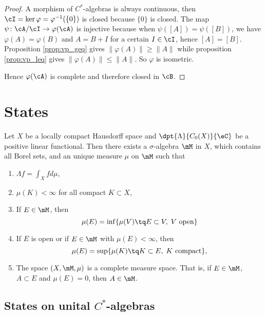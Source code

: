 \begin{proof}
    A morphism of $C^*$-algebras is always continuous,%
    then $\cI=\ker\varphi=\varphi^{-1}(\{ 0 \})$ is closed because $\{ 0 \}$ is closed. The map $\psi\colon \cA/\cI\to \varphi(\cA)$ is injective because when $\psi([A])=\psi([B])$, we have $\varphi(A)=\varphi(B)$ and $A=B+I$ for a certain $I\in\cI$, hence $[A]=[B]$. Proposition \ref{prop:vp_geq} gives $\| \varphi(A) \|\geq\| A \|$ while proposition \ref{prop:vp_leq} gives $\| \varphi(A) \|\leq \| A \|$. So $\varphi$ is isometric.

    Hence $\varphi(\cA)$ is complete and therefore closed in $\cB$.
\end{proof}


\section{States}

\begin{theorem}
Let $X$ be a locally compact Hausdorff space and $\dpt{\Lambda}{C_0(X)}{\eC}$ be a positive linear functional. Then there exists a $\sigma$-algebra $\mM$ in $X$, which contains all Borel sets, and an unique measure $\mu$ on $\mM$ such that

\begin{enumerate}
\item $\Lambda f=\int_Xfd\mu$,
\item $\mu(K)<\infty$ for all compact $K\subset X$,
\item If $E\in\mM$, then
\[ 
  \mu(E)=\inf\{ \mu(V)\tq E\subset V,\; V\textrm{ open} \}
\]
\item If $E$ is open or if $E\in\mM$ with $\mu(E)<\infty$, then
\[ 
  \mu(E)=\sup\{ \mu(K)\tq K\subset E,\; K\textrm{ compact} \},
\]
\item The space $(X,\mM,\mu)$ is a complete measure space. That is, if $E\in\mM$, $A\subset E$ and $\mu(E)=0$, then $A\in\mM$.

\end{enumerate}
\end{theorem}


\subsection{States on unital \texorpdfstring{$C^*$}{C*}-algebras}

